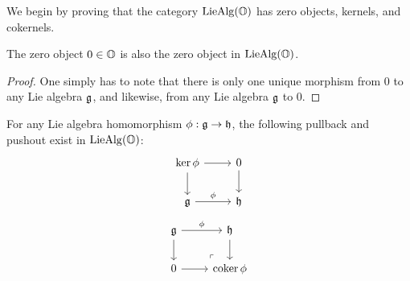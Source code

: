             We begin by proving that the category $\mathrm{Lie}\mathrm{Alg}(\mathbb{O})$ has zero objects, kernels, and cokernels.
            \begin{proposition} \label{prop: zero_lie_algebra}
                The zero object $0 \in \mathbb{O}$ is also the zero object in $\mathrm{Lie}\mathrm{Alg}(\mathbb{O})$.
            \end{proposition}
                \begin{proof}
                    One simply has to note that there is only one unique morphism from $0$ to any Lie algebra $\mathfrak{g}$, and likewise, from any Lie algebra $\mathfrak{g}$ to $0$. 
                \end{proof}
                
            \begin{proposition} \label{prop: (co)kernels_of_lie_algebra_homomorphisms}
                For any Lie algebra homomorphism $\phi: \mathfrak{g} \to \mathfrak{h}$, the following pullback and pushout exist in $\mathrm{Lie}\mathrm{Alg}(\mathbb{O})$:
                    $$
                        \begin{tikzcd}
                        	{\ker \phi} & 0 \\
                        	\g & \h
                        	\arrow["\phi", from=2-1, to=2-2]
                        	\arrow[from=1-1, to=2-1]
                        	\arrow[from=1-1, to=1-2]
                        	\arrow[from=1-2, to=2-2]
                        \end{tikzcd}
                    $$
                    $$
                        \begin{tikzcd}
                        	\g & \h \\
                        	0 & {\coker \phi}
                        	\arrow["\phi", from=1-1, to=1-2]
                        	\arrow[from=1-1, to=2-1]
                        	\arrow[from=2-1, to=2-2]
                        	\arrow[from=1-2, to=2-2]
                        	\arrow["\lrcorner"{anchor=center, pos=0.125, rotate=180}, draw=none, from=2-2, to=1-1]
                        \end{tikzcd}
                    $$
            \end{proposition}
